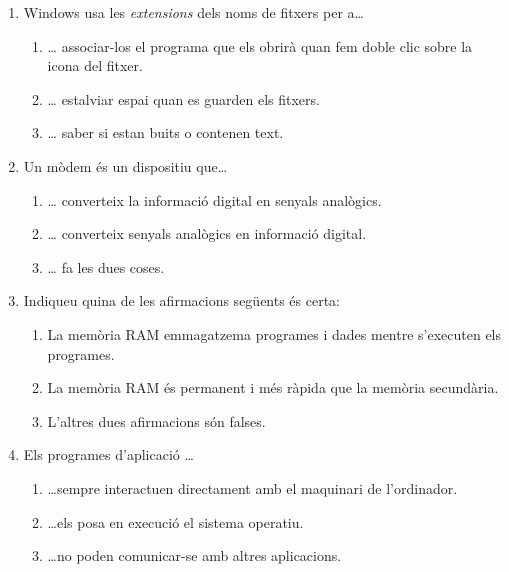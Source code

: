 \begin{enumerate}

\item Windows usa les \emph{extensions} dels noms de fitxers per
  a{\ldots}
  \begin{enumerate}
  \item {\ldots} associar-los el programa que els obrirà quan fem
    doble clic sobre la icona del fitxer.
  \item {\ldots} estalviar espai quan es guarden els fitxers.
  \item {\ldots} saber si estan buits o contenen text.
  \end{enumerate}

\item Un mòdem és un dispositiu que{\ldots}
  \begin{enumerate}
  \item {\ldots} converteix la informació digital en senyals
    analògics.
  \item {\ldots} converteix senyals analògics en informació digital.
  \item {\ldots} fa les dues coses.
  \end{enumerate}

\item Indiqueu quina de les afirmacions següents és certa:
  \begin{enumerate}
  \item La memòria RAM emmagatzema programes i dades mentre s'executen
    els programes.  
  \item La memòria RAM és permanent i més ràpida que la memòria
    secundària.
  \item L'altres dues afirmacions són falses.
  \end{enumerate}

\item Els programes d'aplicació \ldots 
  \begin{enumerate}
  \item \ldots sempre interactuen directament amb el maquinari de
    l'ordinador.  
  \item \ldots els posa en execució el sistema operatiu.
  \item \ldots no poden comunicar-se amb altres
    aplicacions.
  \end{enumerate}


\end{enumerate}
